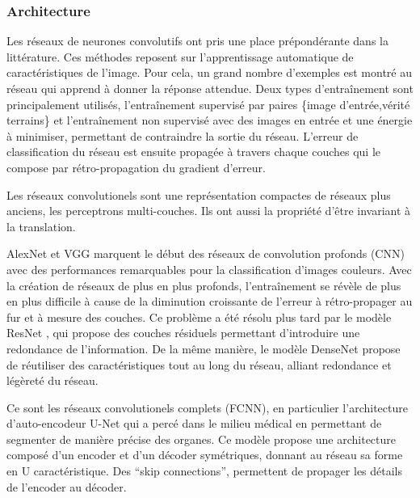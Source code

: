 \subsubsection{Architecture}
Les réseaux de neurones convolutifs ont pris une place prépondérante dans la littérature. Ces méthodes reposent sur l'apprentissage automatique de caractéristiques de l'image. Pour cela, un grand nombre d'exemples est montré au réseau qui apprend à donner la réponse attendue. Deux types d'entraînement sont principalement utilisés, l'entraînement supervisé par paires \{image d'entrée,vérité terrains\} et l'entraînement non supervisé avec des images en entrée et une énergie à minimiser, permettant de contraindre la sortie du réseau. L'erreur de classification du réseau est ensuite propagée à travers chaque couches qui le compose par rétro-propagation du gradient d'erreur.

Les réseaux convolutionels sont une représentation compactes de réseaux plus anciens, les perceptrons multi-couches. Ils ont aussi la propriété d'être invariant à la translation.

AlexNet \cite{krizhevsky2012_AlexNet} et VGG \cite{Simonyan2014_VGG} marquent le début des réseaux de convolution profonds (CNN) avec des performances remarquables pour la classification d'images couleurs. Avec la création de réseaux de plus en plus profonds, l'entraînement se révèle de plus en plus difficile à cause de la diminution croissante de l'erreur à rétro-propager au fur et à mesure des couches. Ce problème a été résolu plus tard par le modèle ResNet \cite{He2016_ResNet}, qui propose des couches résiduels permettant d'introduire une redondance de l'information. De la même manière, le modèle DenseNet \cite{Huang2017_DenseNet} propose de réutiliser des caractéristiques tout au long du réseau, alliant redondance et légèreté du réseau.

Ce sont les réseaux convolutionels complets (FCNN), en particulier l'architecture d'auto-encodeur U-Net \cite{Ronneberger2015_Unet} qui a percé dans le milieu médical en permettant de segmenter de manière précise des organes. Ce modèle propose une architecture composé d'un encoder et d'un décoder symétriques, donnant au réseau sa forme en U caractéristique. Des ``skip connections'', permettent de propager les détails de l'encoder au décoder.

